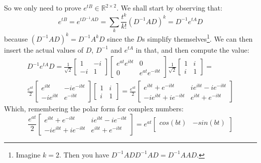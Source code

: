 \begin{example}
    So we only need to prove $e^{tB}\in\mathbb{R}^{2\times 2}$. We shall start by observing that:\begin{equation*}
        e^{tB}=e^{tD^{-1}AD}=\sum_{k}\frac{t^k}{k!}(D^{-1}AD)^{k}=D^{-1}e^{tA}D
    \end{equation*}
    because $(D^{-1}AD)^{k}=D^{-1}A^kD$ since the $D$s simplify themselves\footnote{Imagine $k=2$. Then you have $D^{-1}ADD^{-1}AD=D^{-1}AAD$.}. We can then insert the actual values of $D$, $D^{-1}$ and $e^{tA}$ in that, and then compute the value:
    \begin{align*}
        D^{-1}e^{tA}D=\frac{1}{\sqrt{2}}\begin{bmatrix}
            1 & -i \\
            -i & 1
        \end{bmatrix}\begin{bmatrix}
            e^{at}e^{ibt} & 0 \\
            0 & e^{at}e^{-ibt}
        \end{bmatrix}\frac{1}{\sqrt{2}}\begin{bmatrix}
            1 & i \\
            i & 1
        \end{bmatrix}= \\
        \frac{e^{at}}{2}\begin{bmatrix}
            e^{ibt} & -ie^{-ibt} \\
            -ie^{ibt} & e^{-ibt}
        \end{bmatrix}\begin{bmatrix}
            1 & i \\
            i & 1
        \end{bmatrix}=\frac{e^{at}}{2}\begin{bmatrix}
            e^{ibt}+e^{-ibt} & ie^{ibt}-ie^{-ibt} \\
            -ie^{ibt}+ie^{-ibt} & e^{ibt}+e^{-ibt}
        \end{bmatrix}
    \end{align*}
    Which, remembering the polar form for complex numbers:
    \begin{equation*}
        \frac{e^{at}}{2}\begin{bmatrix}
            e^{ibt}+e^{-ibt} & ie^{ibt}-ie^{-ibt} \\
            -ie^{ibt}+ie^{-ibt} & e^{ibt}+e^{-ibt}
        \end{bmatrix}=e^{at}\begin{bmatrix}
            cos(bt) & -sin(bt) \\

\end{bmatrix}
\end{equation*}
\end{example}
